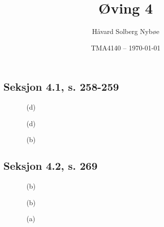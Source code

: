 \documentclass[a4paper, 12pt]{article}  %
\title{Øving 4}               %
\author{Håvard Solberg Nybøe}           %
\date{TMA4140 -- \today}                    %
\begin{document}
\maketitle

\subsection*{Seksjon 4.1, s. 258-259}
\begin{enumerate}
    \item [\boxed{6}]
    \item [\boxed{17}]
          \begin{enumerate}
              \item [(d)]
          \end{enumerate}
    \item [\boxed{18}]
          \begin{enumerate}
              \item [(d)]
          \end{enumerate}
    \item [\boxed{39}]
          \begin{enumerate}
              \item [(b)]
          \end{enumerate}
    \item [\boxed{44}]
\end{enumerate}

\subsection*{Seksjon 4.2, s. 269}
\begin{enumerate}
    \item [\boxed{3}]
          \begin{enumerate}
              \item [(b)]
          \end{enumerate}
    \item [\boxed{7}]
          \begin{enumerate}
              \item [(b)]
          \end{enumerate}
    \item [\boxed{24}]
          \begin{enumerate}
              \item [(a)]
          \end{enumerate}
\end{enumerate}
\end{document}
